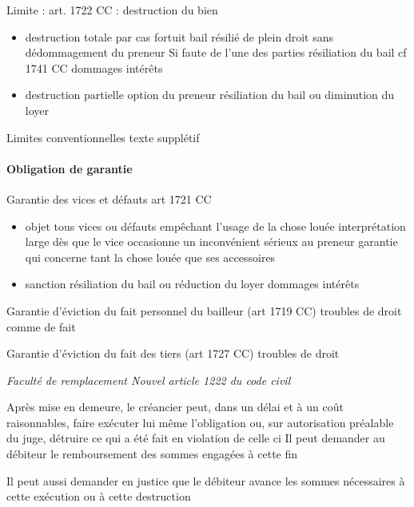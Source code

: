 \documentclass[10pt,a4paper,twoside]{article}
\newenvironment*{focus}[1][]{\medskip \textbf{#1} \newline \itshape}{}
\begin{document}
				Limite : art. 1722 CC : destruction du bien
				\begin{itemize}
					\item destruction totale par cas fortuit bail résilié de plein droit
					sans dédommagement du preneur Si faute de l’une des
					parties résiliation du bail cf 1741 CC dommages intérêts

					\item destruction partielle option du preneur résiliation du bail
					ou diminution du loyer
				\end{itemize}

				Limites conventionnelles texte supplétif

			\paragraph{Obligation de garantie}

				Garantie des vices et défauts art 1721 CC
				\begin{itemize}
					\item objet tous vices ou défauts empêchant l’usage de la chose
					louée interprétation large dès que le vice occasionne un
					inconvénient sérieux au preneur garantie qui concerne tant
					la chose louée que ses accessoires

					\item sanction résiliation du bail ou réduction du loyer
					dommages intérêts
				\end{itemize}

				Garantie d’éviction du fait personnel du bailleur (art 1719 CC)
				troubles de droit comme de fait

				Garantie d’éviction du fait des tiers (art 1727 CC) troubles de
				droit

			\begin{focus}{Faculté de remplacement}
				Nouvel article 1222 du code civil

				Après mise en demeure, le créancier peut, dans un délai et à
				un coût raisonnables, faire exécuter lui même l'obligation ou,
				sur autorisation préalable du juge, détruire ce qui a été fait
				en violation de celle ci Il peut demander au débiteur le
				remboursement des sommes engagées à cette fin

				Il peut aussi demander en justice que le débiteur avance les
				sommes nécessaires à cette exécution ou à cette
				destruction
			\end{focus}
\end{document}
